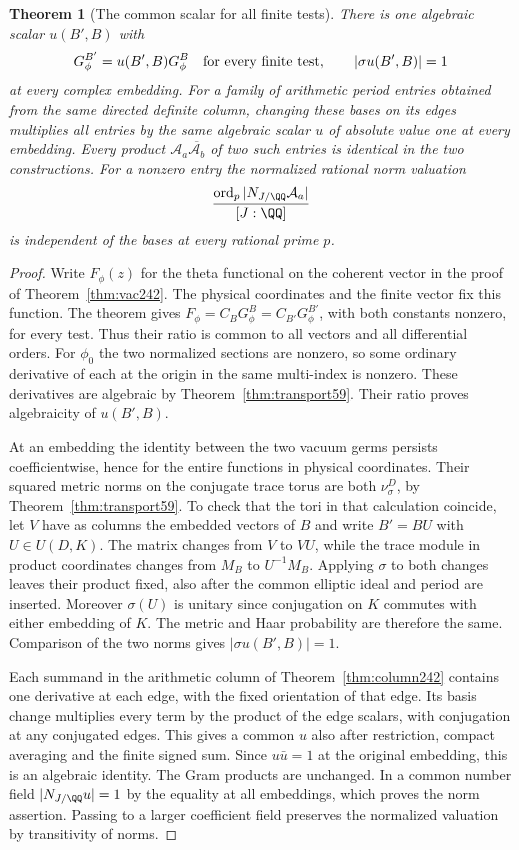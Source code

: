 \documentclass[a4paper,11pt]{article}
\newtheorem{theorem}[proposition]{Theorem}
\theoremstyle{definition}
\theoremstyle{remark}
\numberwithin{equation}{section}
\begin{document}
\begin{theorem}[The common scalar for all finite tests]\leavevmode
\label{thm:framechange314}
There is one algebraic scalar \(u(B',B)\) with
\[
 G_\phi^{B'}=u(B',B)G_\phi^B \quad\hbox{for every finite test},\qquad
                    |\sigma u(B',B)|=1
\]
at every complex embedding. For a family of arithmetic period
entries obtained from the same directed definite column, changing
these bases on its edges multiplies all entries by the same
algebraic scalar \(u\) of absolute value one at every embedding.
Every product \(\mathcal A_a\overline{\mathcal A_b}\) of two such
entries is identical in the two constructions. For a nonzero
entry the normalized rational norm valuation
\[
 \frac{\operatorname{ord}_p |N_{J/\QQ}\mathcal A_a|}{[J:\QQ]}
\]
is independent of the bases at every rational prime \(p\).
\end{theorem}
\begin{proof}
Write \(F_\phi(z)\) for the theta functional on the coherent
vector in the proof of Theorem~\ref{thm:vac242}. The physical
coordinates and the finite vector fix this function. The
theorem gives \(F_\phi=C_B G_\phi^B=C_{B'}G_\phi^{B'}\),
with both constants nonzero, for every test. Thus their ratio
is common to all vectors and all differential orders. For
\(\phi_0\) the two normalized sections are nonzero, so some
ordinary derivative of each at the origin in the same multi-index
is nonzero. These derivatives are algebraic by
Theorem~\ref{thm:transport59}. Their ratio proves algebraicity
of \(u(B',B)\).

At an embedding the identity between the two vacuum germs
persists coefficientwise, hence for the entire functions in
physical coordinates. Their squared metric norms on the conjugate
trace torus are both \(\nu_\sigma^{D}\), by
Theorem~\ref{thm:transport59}. To check that the tori in that
calculation coincide, let \(V\) have as columns the embedded
vectors of \(B\) and write \(B'=B U\) with \(U\in U(D,K)\).
The matrix changes from \(V\) to \(VU\), while the trace module
in product coordinates changes from \(M_B\) to \(U^{-1}M_B\).
Applying \(\sigma\) to both changes leaves their product fixed,
also after the common elliptic ideal and period are inserted.
Moreover \(\sigma(U)\) is unitary since conjugation on \(K\)
commutes with either embedding of \(K\). The metric and Haar
probability are therefore the same. Comparison of the two norms
gives \(|\sigma u(B',B)|=1\).

Each summand in the arithmetic column of
Theorem~\ref{thm:column242} contains one derivative at each
edge, with the fixed orientation of that edge. Its basis change
multiplies every term by the product of the edge scalars, with
conjugation at any conjugated edges. This gives a common \(u\)
also after restriction, compact averaging and the finite signed
sum. Since \(u\bar u=1\) at the original embedding, this is an
algebraic identity. The Gram products are unchanged. In a common
number field \(|N_{J/\QQ}u|=1\) by the equality at all embeddings,
which proves the norm assertion. Passing to a larger coefficient
field preserves the normalized valuation by transitivity of norms.
\end{proof}
\end{document}
